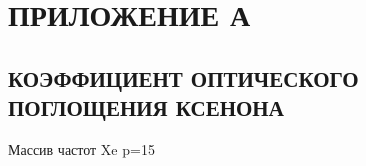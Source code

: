 

\chapter*{ПРИЛОЖЕНИЕ А}\label{toc:attachment-a}
\titleformat{\section}{\bigsize\centering\bfseries}{\thesection}{}{}{}{}
\section*{КОЭФФИЦИЕНТ ОПТИЧЕСКОГО ПОГЛОЩЕНИЯ КСЕНОНА}

\noindent Массив частот Xe p=15

